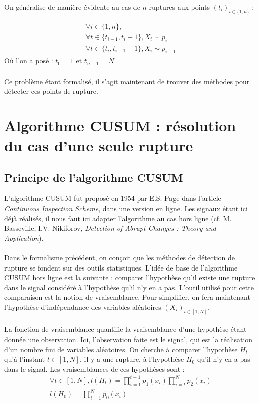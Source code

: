 \documentclass[french,12pt,notitlepage]{report}
\begin{document}
	On généralise de manière évidente au cas de $n$ ruptures aux points $(t_i)_{i \in \{1, n\}}$ :

	\begin{equation}
	\begin{array}{lll}
		\forall i \in \{1, n\}, \\
		\forall t \in \{t_{i-1}, t_i-1\}, X_i \sim p_i \\
		\forall t \in \{t_i, t_{i+1}-1\}, X_i \sim p_{i+1}
	\end{array}
	\label{multi_rupt}
	\end{equation}
	Où l'on a posé : $t_0 = 1$ et $t_{n+1} = N$.
	\\ \\
	Ce problème étant formalisé, il s'agit maintenant de trouver des méthodes pour détecter ces points de rupture.

	\chapter{Algorithme CUSUM : résolution du cas d'une seule rupture}


	\section{Principe de l'algorithme CUSUM}
	L'algorithme CUSUM fut proposé en 1954 par E.S. Page dans l'article \textit{Continuous Inspection Scheme}, dans une version en ligne. Les signaux étant ici déjà réalisés, il nous faut ici adapter l'algorithme au cas hors ligne (cf. M. Basseville, I.V. Nikiforov, \textit{Detection of Abrupt Changes : Theory and Application}).
	\\ \\
	Dans le formalisme précédent, on conçoit que les méthodes de détection de rupture se fondent sur des outils statistiques. L'idée de base de l'algorithme CUSUM hors ligne est la suivante : comparer l'hypothèse qu'il existe une rupture dans le signal considéré à l'hypothèse qu'il n'y en a pas. L'outil utilisé pour cette comparaison est la notion de vraisemblance. Pour simplifier, on fera maintenant l'hypothèse d'indépendance des variables aléatoires $(X_i)_{i \in [1,N]}$.
	\\ \\
	La fonction de vraisemblance quantifie la vraisemblance d'une hypothèse étant donnée une observation. Ici, l'observation faite est le signal, qui est la réalisation d'un nombre fini de variables aléatoires. On cherche à comparer l'hypothèse $H_t$ qu'à l'instant $t \in [1, N]$, il y a une rupture, à l'hypothèse $H_0$ qu'il n'y en a pas dans le signal. Les vraisemblances de ces hypothèses sont :
	\begin{equation}
	\begin{array}{ll}
		\forall t \in [1, N],l(H_t) = \prod_{i = 1}^{t-1} p_1(x_i) \prod_{i = t}^{N} p_2(x_i) \\
		l(H_0) = \prod_{i = 1}^N \tilde{p_0}(x_i) \\
	\end{array}	
	\end{equation}
\end{document}
